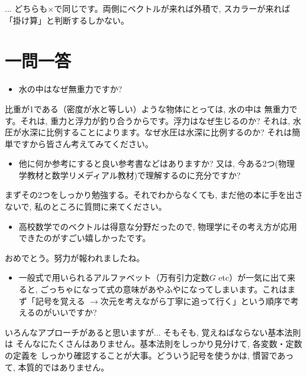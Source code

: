 \begin{faq}{\small{} ... 
どちらも$\times$で同じです。両側にベクトルが来れば外積で, スカラーが来れば「掛け算」と判断するしかない。



\section{一問一答}


\begin{itemize}\item 水の中はなぜ無重力ですか? \end{itemize}

比重が1である（密度が水と等しい）ような物体にとっては, 水の中は
無重力です。それは, 重力と浮力が釣り合うからです。浮力はなぜ生じるのか?
それは, 水圧が水深に比例することによります。なぜ水圧は水深に比例するのか?
それは簡単ですから皆さん考えてみてください。\\

\begin{itemize}\item 他に何か参考にすると良い参考書などはありますか? 
又は, 今ある2つ(物理学教材と数学リメディアル教材)で理解するのに充分ですか?\end{itemize}

まずその2つをしっかり勉強する。それでわからなくても, まだ他の本に手を出さないで, 
私のところに質問に来てください。\\

\begin{itemize}\item 高校数学でのベクトルは得意な分野だったので, 
物理学にその考え方が応用できたのがすごい嬉しかったです。\end{itemize}

おめでとう。努力が報われましたね。\\

\begin{itemize}\item 一般式で用いられるアルファベット（万有引力定数$G$ etc）が一気に出て来ると, 
ごっちゃになって式の意味があやふやになってしまいます。これはまず「記号を覚える
$\rightarrow$次元を考えながら丁寧に追って行く」という順序で考えるのがいいですか?\end{itemize}

いろんなアプローチがあると思いますが... そもそも, 覚えねばならない基本法則は
そんなにたくさんはありません。基本法則をしっかり見分けて, 各変数・定数の定義を
しっかり確認することが大事。どういう記号を使うかは, 慣習であって, 本質的ではありません。\\

}
\end{faq}
